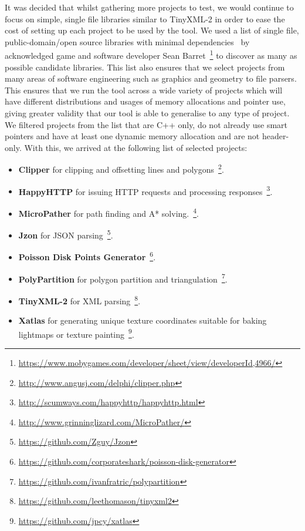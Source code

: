 \documentclass{mpaper}
\begin{document}
    It was decided that whilst gathering more projects to test, we would continue to focus on simple, single file libraries similar to TinyXML-2 in order to ease the cost of setting up each project to be used by the tool. 
    We used a list of single file, public-domain/open source libraries with minimal dependencies~\cite{Barrett2019} by acknowledged game and software developer Sean Barret~\footnote{\url{https://www.mobygames.com/developer/sheet/view/developerId,4966/}} to discover as many as possible candidate libraries.
    This list also ensures that we select projects from many areas of software engineering such as graphics and geometry to file parsers.
    This ensures that we run the tool across a wide variety of projects which will have different distributions and usages of memory allocations and pointer use, giving greater validity that our tool is able to generalise to any type of project.
    We filtered projects from the list that are C++ only, do not already use smart pointers and have at least one dynamic memory allocation and are not header-only.
    With this, we arrived at the following list of selected projects: 
    
    \begin{itemize}
        \item \textbf{Clipper} for clipping and offsetting lines and polygons~\footnote{\url{http://www.angusj.com/delphi/clipper.php}}.
        \item \textbf{HappyHTTP} for issuing HTTP requests and processing responses~\footnote{\url{http://scumways.com/happyhttp/happyhttp.html}}.
        \item \textbf{MicroPather} for path finding and A* solving.~\footnote{\url{http://www.grinninglizard.com/MicroPather/}}.
        \item \textbf{Jzon} for JSON parsing~\footnote{\url{https://github.com/Zguy/Jzon}}.
        \item \textbf{Poisson Disk Points Generator}~\footnote{\url{https://github.com/corporateshark/poisson-disk-generator}}.
        \item \textbf{PolyPartition} for polygon partition and triangulation~\footnote{\url{https://github.com/ivanfratric/polypartition}}.
        \item \textbf{TinyXML-2} for XML parsing~\footnote{\url{https://github.com/leethomason/tinyxml2}}.
        \item \textbf{Xatlas} for generating unique texture coordinates suitable for baking lightmaps or texture painting~\footnote{\url{https://github.com/jpcy/xatlas}}.
    \end{itemize}
    
\end{document}
